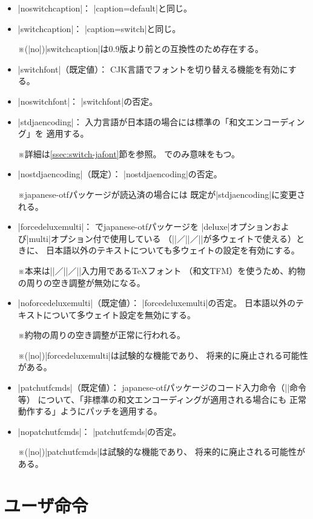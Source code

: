 \documentclass[uplatex,dvipdfmx,a4paper]{jsarticle}
\newcommand{\Pkg}[1]{\textsf{#1}}
\newcommand{\Note}{\par\noindent ※}
\newcommand{\Means}{：\quad\inhibitglue}
\newcommand{\XS}{\hspace{\xkanjiskip}}
\begin{document}
\begin{itemize}
\item |noswitchcaption|\Means
|caption=default|と同じ。

\item |switchcaption|\Means
|caption=switch|と同じ。
\Note (|no|)|switchcaption|は0.9版より前との互換性のため存在する。

\item |switchfont|（既定値）\Means
CJK言語でフォントを切り替える機能を有効にする。

\item |noswitchfont|\Means
|switchfont|の否定。

\item |stdjaencoding|\Means
入力言語が日本語の場合には{\upLaTeX}標準の「和文エンコーディング」を
適用する。
\Note 詳細は\ref{ssec:switch-jafont}節を参照。
{\upLaTeX}でのみ意味をもつ。

\item |nostdjaencoding|（既定）\Means
|nostdjaencoding|の否定。
\Note \Pkg{japanese-otf}パッケージが読込済の場合には
既定が|stdjaencoding|に変更される。

\item |forcedeluxemulti|\Means
{\upLaTeX}で\Pkg{japanese-otf}パッケージを
|deluxe|オプションおよび|multi|オプション付で使用している
（|\UTFK|／|\UTFC|／|\UTFT|が多ウェイトで使える）ときに、
日本語以外のテキストについても多ウェイトの設定を有効にする。
\Note 本来は\XS|\UTFK|／|\UTFC|／|\UTFT|入力用である{\TeX}フォント
（和文TFM）を使うため、約物の周りの空き調整が無効になる。

\item |noforcedeluxemulti|（既定値）\Means
|forcedeluxemulti|の否定。
日本語以外のテキストについて多ウェイト設定を無効にする。
\Note 約物の周りの空き調整が正常に行われる。
\Note (|no|)|forcedeluxemulti|は試験的な機能であり、
将来的に廃止される可能性がある。

\item |patchutfcmds|（既定値）\Means
\Pkg{japanese-otf}パッケージのコード入力命令（\XS|\UTF|命令等）
について、「非標準の和文エンコーディングが適用される場合にも
正常動作する」ようにパッチを適用する。

\item |nopatchutfcmds|\Means
|patchutfcmds|の否定。
\Note (|no|)|patchutfcmds|は試験的な機能であり、
将来的に廃止される可能性がある。
\end{itemize}

\section{ユーザ命令}
\label{sec:Commands}
\end{document}
